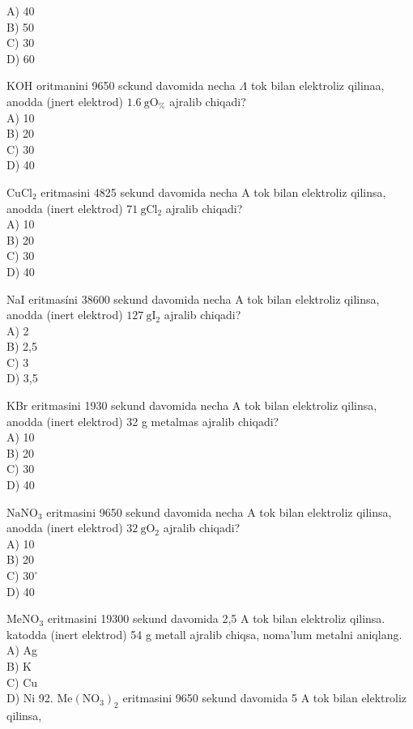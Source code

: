 A) 40\\
B) 50\\
C) 30\\
D) 60
  \item KOH oritmanini 9650 sckund davomida necha $\Lambda$ tok bilan elektroliz qilinaa, anodda (jnert elektrod) $1.6 \mathrm{~g} \mathrm{O}_{\%}$ ajralib chiqadi?\\
A) 10\\
B) 20\\
C) 30\\
D) 40
  \item $\mathrm{CuCl}_{2}$ eritmasini 4825 sekund davomida necha A tok bilan elektroliz qilinsa, anodda (inert elektrod) $71 \mathrm{~g} \mathrm{Cl}_{2}$ ajralib chiqadi?\\
A) 10\\
B) 20\\
C) 30\\
D) 40
  \item NaI eritmasíni 38600 sekund davomida necha A tok bilan elektroliz qilinsa, anodda (inert elektrod) $127 \mathrm{~g} \mathrm{I}_{2}$ ajralib chiqadi?\\
A) 2\\
B) 2,5\\
C) 3\\
D) 3,5
  \item KBr eritmasini 1930 sekund davomida necha A tok bilan elektroliz qilinsa, anodda (inert elektrod) 32 g metalmas ajralib chiqadi?\\
A) 10\\
B) 20\\
C) 30\\
D) 40
  \item $\mathrm{NaNO}_{3}$ eritmasini 9650 sekund davomida necha A tok bilan elektroliz qilinsa, anodda (inert elektrod) $32 \mathrm{~g} \mathrm{O}_{2}$ ajralib chiqadi?\\
A) 10\\
B) 20\\
C) $30^{\circ}$\\
D) 40
  \item $\mathrm{MeNO}_{3}$ eritmasini 19300 sekund davomida 2,5 A tok bilan elektroliz qilinsa. katodda (inert elektrod) 54 g metall ajralib chiqsa, noma'lum metalni aniqlang.\\
A) Ag\\
B) K\\
C) Cu\\
D) Ni
92. $\mathrm{Me}\left(\mathrm{NO}_{3}\right)_{2}$ eritmasini 9650 sekund davomida 5 A tok bilan elektroliz qilinsa,\\
